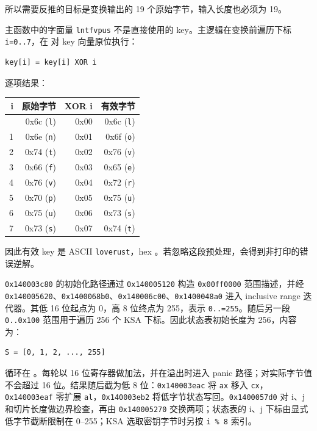 所以需要反推的目标是变换输出的 19 个原始字节，输入长度也必须为 19。

主函数中的字面量 \texttt{lntfvpus} 不是直接使用的 key。主逻辑在变换前遍历下标 \texttt{i=0..7}，在 \texttt{} 对 key 向量原位执行：

\begin{verbatim}
key[i] = key[i] XOR i
\end{verbatim}

逐项结果：

{\def\LTcaptype{} %
\begin{longtable}[]{@{}rrrr@{}}
\toprule\noalign{}
i & 原始字节 & XOR i & 有效字节 \\
\midrule\noalign{}
\endhead
\bottomrule\noalign{}
\endlastfoot
0 & 0x6c (\texttt{l}) & 0x00 & 0x6c (\texttt{l}) \\
1 & 0x6e (\texttt{n}) & 0x01 & 0x6f (\texttt{o}) \\
2 & 0x74 (\texttt{t}) & 0x02 & 0x76 (\texttt{v}) \\
3 & 0x66 (\texttt{f}) & 0x03 & 0x65 (\texttt{e}) \\
4 & 0x76 (\texttt{v}) & 0x04 & 0x72 (\texttt{r}) \\
5 & 0x70 (\texttt{p}) & 0x05 & 0x75 (\texttt{u}) \\
6 & 0x75 (\texttt{u}) & 0x06 & 0x73 (\texttt{s}) \\
7 & 0x73 (\texttt{s}) & 0x07 & 0x74 (\texttt{t}) \\
\end{longtable}
}

因此有效 key 是 ASCII \texttt{loverust}，hex \texttt{}。若忽略这段预处理，会得到非打印的错误逆解。

\texttt{0x140003c80} 的初始化路径通过 \texttt{0x140005120} 构造 \texttt{0x00ff0000} 范围描述，并经 \texttt{0x140005620}、\texttt{0x1400068b0}、\texttt{0x140006c00}、\texttt{0x1400048a0} 进入 inclusive range 迭代器。其低 16 位起点为 0，高 8 位终点为 255，表示 \texttt{0..=255}。随后另一段 \texttt{0..0x100} 范围用于遍历 256 个 KSA 下标。因此状态表初始长度为 256，内容为：

\begin{verbatim}
S = [0, 1, 2, ..., 255]
\end{verbatim}

循环在 \texttt{}。每轮以 16 位寄存器做加法，并在溢出时进入 panic 路径；对实际字节值不会超过 16 位。结果随后截为低 8 位：\texttt{0x140003eac} 将 \texttt{ax} 移入 \texttt{cx}，\texttt{0x140003eaf} 零扩展 \texttt{al}，\texttt{0x140003eb2} 将低字节状态写回。\texttt{0x1400057d0} 对 i、j 和切片长度做边界检查，再由 \texttt{0x140005270} 交换两项；状态表的 i、j 下标由显式低字节截断限制在 0--255；KSA 选取密钥字节时另按 \texttt{i\ \%\ 8} 索引。

